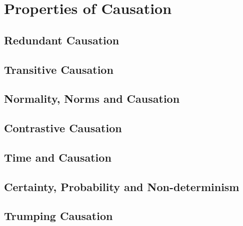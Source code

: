 \documentclass[11pt,a4paper]{book}
\theoremstyle{definition}
\theoremstyle{definition}
\theoremstyle{definition}
\theoremstyle{remark}
\begin{document}
%
%

%




\section{Properties of Causation}

\subsection{Redundant Causation}


\subsection{Transitive Causation}

\subsection{Normality, Norms and Causation}
\subsection{Contrastive Causation}

\subsection{Time and Causation}

\subsection{Certainty, Probability and Non-determinism}

\subsection{Trumping Causation}
\end{document}
